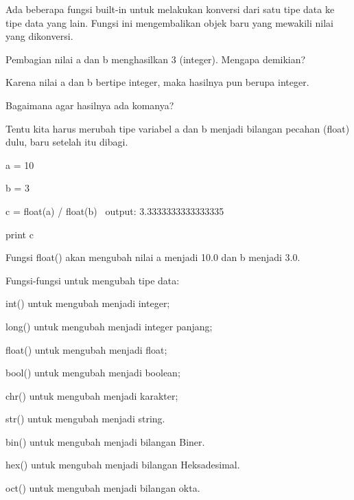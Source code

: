 Ada beberapa fungsi built-in untuk melakukan konversi dari satu tipe data ke tipe data yang lain. $  $Fungsi ini mengembalikan objek baru yang mewakili nilai yang dikonversi. \par
\vspace{12pt}
\noindent 
Pembagian nilai $  $a $  $dan $  $b $  $menghasilkan $  $3 $  $(integer). Mengapa demikian? \par
\vspace{12pt}
\noindent 
Karena nilai $  $a $  $dan $  $b $  $bertipe integer, maka hasilnya pun berupa integer. \par
\vspace{12pt}
\noindent 
Bagaimana agar hasilnya ada komanya? \par
\vspace{12pt}
\noindent 
Tentu kita harus merubah tipe variabel $  $a $  $dan $  $b $  $menjadi bilangan pecahan (float) dulu, baru setelah itu dibagi. \par
\vspace{12pt}
\noindent 
a = 10 \par
\noindent 
b = 3 \par
\noindent 
c = float(a) / float(b)~ output: 3.3333333333333335 \par
\vspace{12pt}
\noindent 
print c \par
\vspace{12pt}
\noindent 
Fungsi $  $float() $  $akan mengubah nilai $  $a $  $menjadi $  $10.0 $  $dan $  $b $  $menjadi $  $3.0. \par
\vspace{12pt}
\noindent 
Fungsi-fungsi untuk mengubah tipe data: \par
\vspace{12pt}
\noindent 
int() $  $untuk mengubah menjadi integer; \par
\vspace{12pt}
\noindent 
long() $  $untuk mengubah menjadi integer panjang; \par
\vspace{12pt}
\noindent 
float() $  $untuk mengubah menjadi float; \par
\vspace{12pt}
\noindent 
bool() $  $untuk mengubah menjadi boolean; \par
\vspace{12pt}
\noindent 
chr() $  $untuk mengubah menjadi karakter; \par
\vspace{12pt}
\noindent 
str() $  $untuk mengubah menjadi string. \par
\vspace{12pt}
\noindent 
bin() $  $untuk mengubah menjadi bilangan Biner. \par
\vspace{12pt}
\noindent 
hex() $  $untuk mengubah menjadi bilangan Heksadesimal. \par
\vspace{12pt}
\noindent 
oct() $  $untuk mengubah menjadi bilangan okta. \par
\vspace{12pt}
\vspace{12pt}


